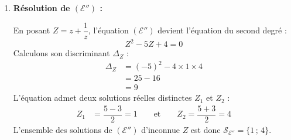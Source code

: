 \documentclass[12pt,a4paper]{article}
\begin{document}
\begin{enumerate}
    Comme $z = 0$ n'est pas solution de $(\mathcal{E}')$, on peut diviser chaque membre de l'équation $(\mathcal{E}')$ par $z^2 \neq 0$ :
    $$
    \begin{aligned}
        z^4 - 5z^3 + 6z^2 - 5z + 1 = 0 &\iff \dfrac{z^4 - 5z^3 + 6z^2 - 5z + 1}{z^2} = 0 \\
        &\iff z^2 - 5z + 6 - \dfrac{5}{z} + \dfrac{1}{z^2} = 0 \\
        &\iff \left(z^2 + \dfrac{1}{z^2}\right) - 5\left(z + \dfrac{1}{z}\right) + 6 = 0
    \end{aligned}
    $$
    Or, on sait que :
    $$
    \begin{aligned}
        \left(z + \dfrac{1}{z}\right)^2 &= z^2 + 2 \times z \times \dfrac{1}{z} + \dfrac{1}{z^2} \\
        &= z^2 + 2 + \dfrac{1}{z^2}
    \end{aligned}
    $$
    d'où $z^2 + \dfrac{1}{z^2} = \left(z + \dfrac{1}{z}\right)^2 - 2$. En remplaçant dans l'équation précédente, il vient :
    $$
    \begin{aligned}
        (\mathcal{E}') &\iff \left(z + \dfrac{1}{z}\right)^2 - 2 - 5\left(z + \dfrac{1}{z}\right) + 6 = 0 \\
        &\iff \left(z + \dfrac{1}{z}\right)^2 - 5\left(z + \dfrac{1}{z}\right) + 4 = 0
    \end{aligned}
    $$
    L'équation $(\mathcal{E}')$ est donc bien équivalente à l'équation $(\mathcal{E''})$.

    \item \textbf{Résolution de $(\mathcal{E''})$ :}
    
    En posant $Z = z + \dfrac{1}{z}$, l'équation $(\mathcal{E''})$ devient l'équation du second degré :
    $$
    Z^2 - 5Z + 4 = 0
    $$
    Calculons son discriminant $\Delta_Z$ :
    $$
    \begin{aligned}
        \Delta_Z &= (-5)^2 - 4 \times 1 \times 4 \\
        &= 25 - 16 \\
        &= 9
    \end{aligned}
    $$
    L'équation admet deux solutions réelles distinctes $Z_1$ et $Z_2$ :
    $$
    \begin{aligned}
        Z_1 &= \dfrac{5 - 3}{2} = 1 \qquad \text{et} \qquad Z_2 = \dfrac{5 + 3}{2} = 4
    \end{aligned}
    $$
    L'ensemble des solutions de $(\mathcal{E''})$ d'inconnue $Z$ est donc $\mathcal{S}_{\mathcal{E''}} = \{1 \,;\, 4\}$.


\end{enumerate}
\end{document}
